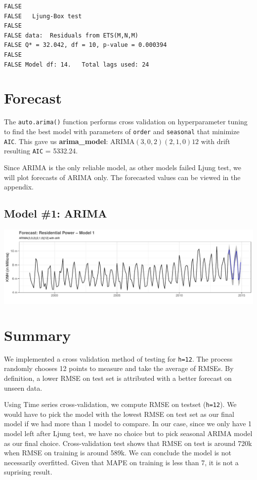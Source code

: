 \documentclass[openany]{book}
\begin{document}
\begin{verbatim}
FALSE 
FALSE   Ljung-Box test
FALSE 
FALSE data:  Residuals from ETS(M,N,M)
FALSE Q* = 32.042, df = 10, p-value = 0.000394
FALSE 
FALSE Model df: 14.   Total lags used: 24
\end{verbatim}

\hypertarget{forecast-1}{%
\section{Forecast}\label{forecast-1}}

The \texttt{auto.arima()} function performs cross validation on
hyperparameter tuning to find the best model with parameters of
\texttt{order} and \texttt{seasonal} that minimize \texttt{AIC}. This
gave us \textbf{arima\_model}: ARIMA\((3,0,2)(2,1,0)12\) with drift
resulting \texttt{AIC} = 5332.24.

Since ARIMA is the only reliable model, as other models failed Ljung
test, we will plot forecasts of ARIMA only. The forecasted values can be
viewed in the appendix.

\hypertarget{model-1-arima-1}{%
\subsection{Model \#1: ARIMA}\label{model-1-arima-1}}

\includegraphics{Group2_Project1_Fall2019_files/figure-latex/unnamed-chunk-15-1.pdf}

\hypertarget{summary-1}{%
\section{Summary}\label{summary-1}}

We implemented a cross validation method of testing for \texttt{h=12}.
The process randomly chooses 12 points to measure and take the average
of RMSEs. By definition, a lower RMSE on test set is attributed with a
better forecast on unseen data.

Using Time series cross-validation, we compute RMSE on testset
(\texttt{h=12}). We would have to pick the model with the lowest RMSE on
test set as our final model if we had more than 1 model to compare. In
our case, since we only have 1 model left after Ljung test, we have no
choice but to pick seasonal ARIMA model as our final choice.
Cross-validation test shows that RMSE on test is around 720k when RMSE
on training is around 589k. We can conclude the model is not necessarily
overfitted. Given that MAPE on training is less than 7, it is not a
suprising result.
\end{document}

